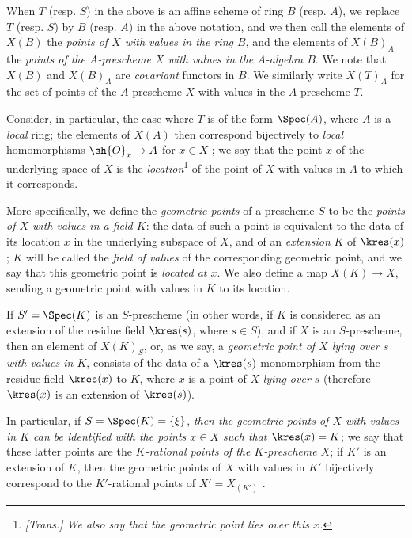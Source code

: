 \begin{env}[3.4.4]
\label{I.3.4.4}
When $T$ (resp. $S$) in the above is an affine scheme of ring $B$ (resp. $A$), we replace
$T$ (resp. $S$) by $B$ (resp. $A$) in the above notation, and we then call the elements of
$X(B)$ the \emph{points of $X$ with values in the ring $B$}, and the elements of $X(B)_A$ the
\emph{points of the $A$-prescheme $X$ with values in the $A$-algebra $B$}. We note that
$X(B)$ and $X(B)_A$ are \emph{covariant} functors in $B$. We similarly write $X(T)_A$ for the
set of points of the $A$-prescheme $X$ with values in the $A$-prescheme $T$.
\end{env}

\begin{env}[3.4.5]
\label{I.3.4.5}
Consider, in particular, the case where $T$ is of the form $\Spec(A)$, where $A$ is a
\emph{local} ring; the elements of $X(A)$ then correspond bijectively to \emph{local}
homomorphisms $\sh{O}_x\to A$ for $x\in X$ ; we say that the
point $x$ of the underlying space of $X$ is the \emph{location}\footnote{\emph{[Trans.] We also say that
\emph{the geometric point lies over this $x$}.}} of the point of $X$ with values in $A$ to which it corresponds.

More specifically, we define the \emph{geometric points} of a prescheme $S$ to be the \emph{points of
$X$ with values in a field $K$}: the data of such a point is equivalent to the data of its
location $x$ in the underlying subspace of $X$, and of an \emph{extension} $K$ of $\kres(x)$;
$K$ will be called the \emph{field of values} of the corresponding geometric point, and we
say that this geometric point is \emph{located at $x$}. We also define a map $X(K)\to X$,
sending a geometric point with values in $K$ to its location.

If $S'=\Spec(K)$ is an $S$-prescheme (in other words, if $K$ is considered as an extension
of the residue field $\kres(s)$, where $s\in S$), and if $X$ is an $S$-prescheme, then an
element of $X(K)_S$, or, as we say, a \emph{geometric point of $X$ lying over $s$ with values
in $K$}, consists of the data of a $\kres(s)$-monomorphism from the residue field $\kres(x)$
to $K$, where $x$ is a point of $X$ \emph{lying over $s$} (therefore $\kres(x)$ is an
extension of $\kres(s)$).

In particular, if $S=\Spec(K)=\{\xi\}$, \emph{then the geometric points of $X$ with values in
$K$ can be identified with the points $x\in X$ such that $\kres(x)=K$}; we say that these latter
points are the \emph{$K$-rational points of the $K$-prescheme $X$}; if $K'$ is an extension
of $K$, then the geometric points of $X$ with values in $K'$ bijectively correspond to the
$K'$-rational points of $X'=X_{(K')}$ .
\end{env}

